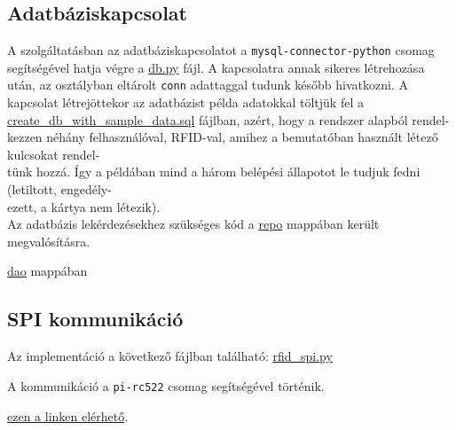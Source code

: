 \documentclass[11pt, a4paper]{article}
\begin{document}
		\subsection{Adatbáziskapcsolat}
			\begin{flushleft}
				\justifying
				A szolgáltatásban az adatbáziskapcsolatot a \texttt{mysql-connector-python} csomag segítségével hatja végre a
				\color{blue}
				\href{https://github.com/mark182182/GKLB_INTM020_mikroelektromechanikai_rendszerek/blob/main/db/db.py}{db.py}
				\color{black} fájl. A kapcsolatra annak sikeres létrehozása után, az osztályban eltárolt \texttt{conn} adattaggal tudunk később hivatkozni. A kapcsolat létrejöttekor az adatbázist példa adatokkal töltjük fel a \color{blue}
				\href{https://github.com/mark182182/GKLB_INTM020_mikroelektromechanikai_rendszerek/blob/main/db/create_db_with_sample_data.sql}{create\_db\_with\_sample\_data.sql}
				\color{black} fájlban, azért, hogy a rendszer alapból rendel-\\kezzen néhány felhasználóval, RFID-val, amihez a bemutatóban használt létező kulcsokat rendel-\\tünk hozzá. Így a példában mind a három belépési állapotot le tudjuk fedni (letiltott, engedély-\\ezett, a kártya nem létezik). \\
				Az adatbázis lekérdezésekhez szükséges kód a 
				\color{blue}
				\href{https://github.com/mark182182/GKLB_INTM020_mikroelektromechanikai_rendszerek/tree/main/repo}{repo}
				\color{black} mappában került megvalósításra.
				
				\color{blue}
				\href{https://github.com/mark182182/GKLB_INTM020_mikroelektromechanikai_rendszerek/tree/main/dao}{dao}
				\color{black} mappában
				
				
				
			\end{flushleft}

		\subsection{SPI kommunikáció}
			\begin{flushleft}
				\justifying
				Az implementáció a következő fájlban található:
				\color{blue}
				\href{https://github.com/mark182182/GKLB_INTM020_mikroelektromechanikai_rendszerek/blob/main/raspi/rfid_spi.py}{rfid\_spi.py}
				
				A kommunikáció a \texttt{pi-rc522} csomag segítségével történik.
				
				\color{blue}
				\href{https://pip.pypa.io/en/stable/user_guide/}{ezen a linken elérhető}\color{black}.
			\end{flushleft}
			
\end{document}
